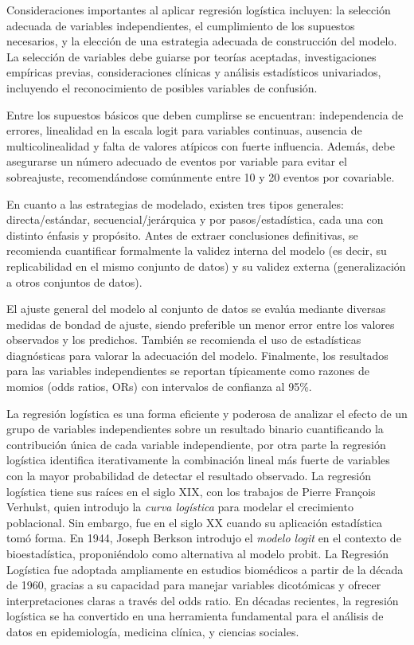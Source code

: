 \documentclass[12pt]{article}
\begin{document}
Consideraciones importantes al aplicar regresión logística incluyen: la selección adecuada de variables independientes, el cumplimiento de los supuestos necesarios, y la elección de una estrategia adecuada de construcción del modelo. La selección de variables debe guiarse por teorías aceptadas, investigaciones empíricas previas, consideraciones clínicas y análisis estadísticos univariados, incluyendo el reconocimiento de posibles variables de confusión.

Entre los supuestos básicos que deben cumplirse se encuentran: independencia de errores, linealidad en la escala logit para variables continuas, ausencia de multicolinealidad y falta de valores atípicos con fuerte influencia. Además, debe asegurarse un número adecuado de eventos por variable para evitar el sobreajuste, recomendándose comúnmente entre 10 y 20 eventos por covariable.

En cuanto a las estrategias de modelado, existen tres tipos generales: directa/estándar, secuencial/jerárquica y por pasos/estadística, cada una con distinto énfasis y propósito. Antes de extraer conclusiones definitivas, se recomienda cuantificar formalmente la validez interna del modelo (es decir, su replicabilidad en el mismo conjunto de datos) y su validez externa (generalización a otros conjuntos de datos).

El ajuste general del modelo al conjunto de datos se evalúa mediante diversas medidas de bondad de ajuste, siendo preferible un menor error entre los valores observados y los predichos. También se recomienda el uso de estadísticas diagnósticas para valorar la adecuación del modelo. Finalmente, los resultados para las variables independientes se reportan típicamente como razones de momios (odds ratios, ORs) con intervalos de confianza al 95\%.

La regresi\'on log\'istica es una forma eficiente y poderosa de analizar el efecto de un grupo de variables independientes sobre un resultado binario cuantificando la contribuci\'on \'unica de cada variable independiente, por otra parte la regresi\'on log\'istica identifica iterativamente la combinaci\'on lineal m\'as fuerte de variables con la mayor probabilidad de detectar el resultado observado. La regresi\'on log\'istica tiene sus ra\'ices en el siglo XIX, con los trabajos de Pierre François Verhulst, quien introdujo la \textit{curva log\'istica} para modelar el crecimiento poblacional. Sin embargo, fue en el siglo XX cuando su aplicaci\'on estad\'istica tom\'o forma. En 1944, Joseph Berkson introdujo el \textit{modelo logit} en el contexto de bioestad\'istica, proponi\'endolo como alternativa al modelo probit. La Regresi\'on Log\'istica fue adoptada ampliamente en estudios biom\'edicos a partir de la d\'ecada de 1960, gracias a su capacidad para manejar variables dicot\'omicas y ofrecer interpretaciones claras a trav\'es del odds ratio. En d\'ecadas recientes, la regresi\'on log\'istica se ha convertido en una herramienta fundamental para el an\'alisis de datos en epidemiolog\'ia, medicina cl\'inica, y ciencias sociales.
\end{document}
